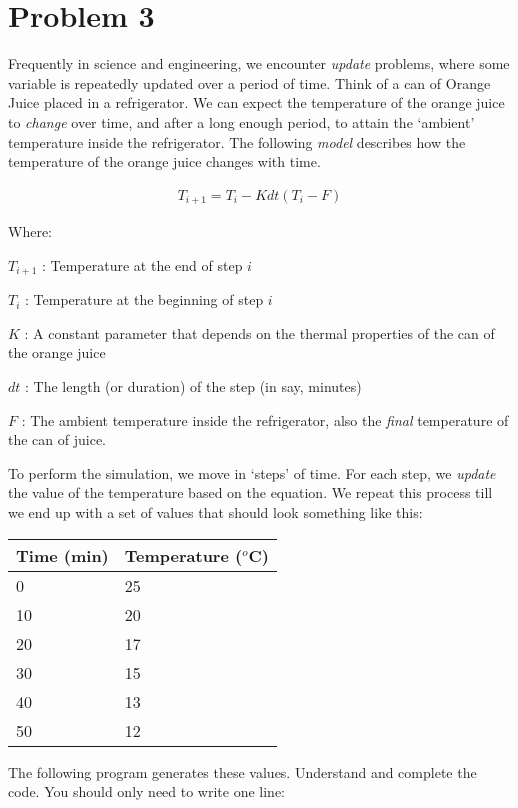 \documentclass{article}
\begin{document}
\section*{Problem 3}

Frequently in science and engineering, we encounter \emph{update}
problems, where some variable is repeatedly updated over a period
of time. Think of a can of Orange Juice placed in a refrigerator. 
We can expect the temperature of the orange juice to \emph{change} 
over time, and after a long enough period, to attain the `ambient'
temperature inside the refrigerator. The following \emph{model} 
describes how the temperature of the orange juice changes with time.

\begin{align}
T_{i+1} = T_{i} - K dt (T_i - F)
\end{align}

Where:

$T_{i+1}$ : Temperature at the end of step $i$

$T_i$     : Temperature at the beginning of step $i$

$K$       : A constant parameter that depends on the thermal properties
            of the can of the orange juice

$dt$      : The length (or duration) of the step (in say, minutes)

$F$       : The ambient temperature inside the refrigerator, also the 
            \emph{final} temperature of the can of juice.


To perform the simulation, we move in `steps' of time. 
For each step, we \emph{update}
the value of the temperature based on the equation. We repeat
this process till we end up with a set of values that should look
something like this:

\begin{table}[h!]
\begin{tabular}{|l|l|}
\hline
Time (min) & Temperature ($^{o}$C) \\
\hline
0    & 25 \\
10   & 20 \\   
20   & 17 \\
30   & 15 \\
40   & 13 \\
50   & 12 \\
\hline 
\end{tabular}
\end{table}

The following program generates these values. Understand and complete
the code. You should only need to write one line:
\end{document}
